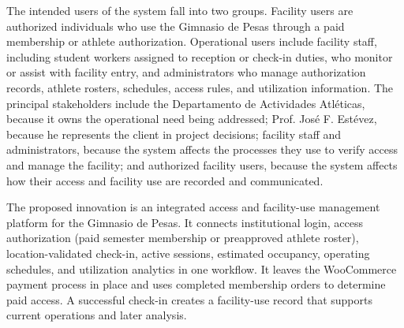 The intended users of the system fall into two groups. Facility users are authorized individuals who use the Gimnasio de Pesas through a paid membership or athlete authorization. Operational users include facility staff, including student workers assigned to reception or check-in duties, who monitor or assist with facility entry, and administrators who manage authorization records, athlete rosters, schedules, access rules, and utilization information. The principal stakeholders include the Departamento de Actividades Atléticas, because it owns the operational need being addressed; Prof. José F. Estévez, because he represents the client in project decisions; facility staff and administrators, because the system affects the processes they use to verify access and manage the facility; and authorized facility users, because the system affects how their access and facility use are recorded and communicated.

The proposed innovation is an integrated access and facility-use management platform for the Gimnasio de Pesas. It connects institutional login, access authorization (paid semester membership or preapproved athlete roster), location-validated check-in, active sessions, estimated occupancy, operating schedules, and utilization analytics in one workflow. It leaves the WooCommerce payment process in place and uses completed membership orders to determine paid access. A successful check-in creates a facility-use record that supports current operations and later analysis.


